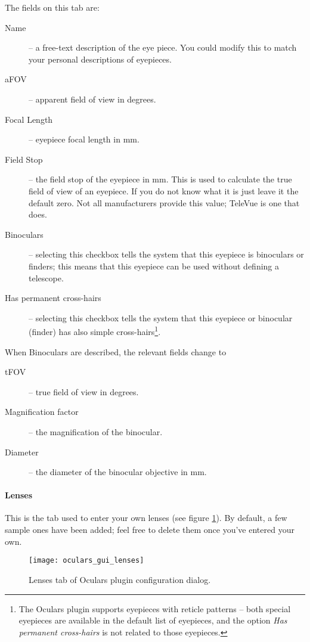 The fields on this tab are:
\begin{description}
\item[Name] -- a free-text description of the eye piece. You could modify this to match your personal descriptions of eyepieces.
\item[aFOV] -- apparent field of view in degrees.
\item[Focal Length] -- eyepiece focal length in mm.
\item[Field Stop] -- the field stop of the eyepiece in mm. This is used to calculate the true field of view of an eyepiece. If you do not know what it is just leave it the default zero. Not all manufacturers provide this value; TeleVue is one that does.
\item[Binoculars] -- selecting this checkbox tells the system that this eyepiece is binoculars or finders; this means that this eyepiece can be used without defining a telescope.
\item[Has permanent cross-hairs] -- selecting this checkbox tells the system that this eyepiece or binocular (finder) has also simple cross-hairs\footnote{The Oculars plugin supports eyepieces with reticle patterns -- both special eyepieces are available in the default list of eyepieces, and the option \emph{Has permanent cross-hairs} is not related to those eyepieces.}.
\end{description}
When Binoculars are described, the relevant fields change to
\begin{description}
\item[tFOV] -- true field of view in degrees.
\item[Magnification factor] -- the magnification of the binocular.
\item[Diameter] -- the diameter of the binocular objective in mm.
\end{description}


\paragraph{Lenses}

This is the tab used to enter your own lenses (see figure \ref{fig:plugins:Oculars:Gui:Lenses}). By default, a few sample ones have been added; feel free to delete them once you've entered your own.

\begin{figure}[ht]\centering
\texttt{[image: oculars\_gui\_lenses]}
\caption{Lenses tab of Oculars plugin configuration dialog.}
\label{fig:plugins:Oculars:Gui:Lenses}
\end{figure}

